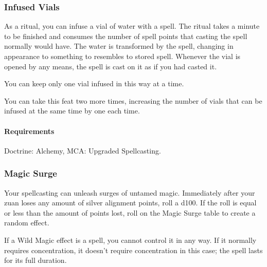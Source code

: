 \subsubsection{Infused Vials} \label{feat::infusedvials}
    As a ritual, you can infuse a vial of water with a spell.
    The ritual takes a minute to be finished and consumes the number of spell points that casting the spell normally would have.
    The water is transformed by the spell, changing in appearance to something to resembles to stored spell.
    Whenever the vial is opened by any means, the spell is cast on it as if you had casted it.

    You can keep only one vial infused in this way at a time.

    You can take this feat two more times, increasing the number of vials that can be infused at the same time by one each time.
    \paragraph{Requirements} Doctrine: Alchemy, MCA: Upgraded Spellcasting.
\subsubsection{Magic Surge} \label{feat::magicsurge}
    Your spellcasting can unleash surges of untamed magic.
    Immediately after your zuan loses any amount of silver alignment points, roll a d100.
    If the roll is equal or less than the amount of points lost, roll on the Magic Surge table to create a random effect.

    If a Wild Magic effect is a spell, you cannot control it in any way.
    If it normally requires concentration, it doesn't require concentration in this case; the spell lasts for its full duration.


